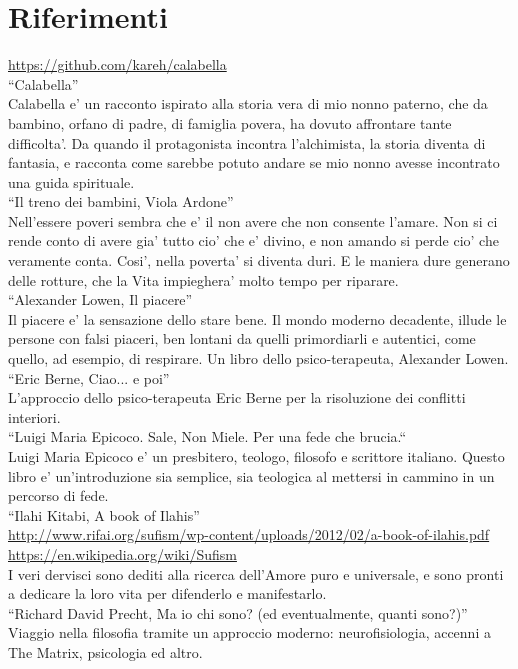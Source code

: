 \chapter{Riferimenti}
\label{chapRiferimenti}

  \url{https://github.com/kareh/calabella}\\
  ``Calabella''\\
  Calabella e' un racconto ispirato alla storia vera di mio nonno paterno, che da bambino, orfano di padre, di famiglia povera, ha dovuto affrontare tante difficolta'. Da quando il protagonista incontra l'alchimista, la storia diventa di fantasia, e racconta come sarebbe potuto andare se mio nonno avesse incontrato una guida spirituale.\\

  ``Il treno dei bambini, Viola Ardone''\\
  Nell'essere poveri sembra che e' il non avere che non consente l'amare. Non si ci rende conto di avere gia' tutto cio' che e' divino, e non amando si perde cio' che veramente conta. Cosi', nella poverta' si diventa duri. E le maniera dure generano delle rotture, che la Vita impieghera' molto tempo per riparare. \\

  ``Alexander Lowen, Il piacere''\\
  Il piacere e' la sensazione dello stare bene. Il mondo moderno decadente, illude le persone
  con falsi piaceri, ben lontani da quelli primordiarli e autentici, come quello, ad esempio,
  di respirare. Un libro dello psico-terapeuta, Alexander Lowen.\\
  
  ``Eric Berne, Ciao... e poi''\\
  L'approccio dello psico-terapeuta Eric Berne per la risoluzione dei conflitti interiori.\\
  
  ``Luigi Maria Epicoco. Sale, Non Miele. Per una fede che brucia.``\\
  Luigi Maria Epicoco e' un presbitero, teologo, filosofo e scrittore italiano. Questo libro e' un'introduzione sia semplice, sia teologica al mettersi in cammino in un percorso di fede.\\

  ``Ilahi Kitabi, A book of Ilahis''\\
  \url{http://www.rifai.org/sufism/wp-content/uploads/2012/02/a-book-of-ilahis.pdf}\\
  \url{https://en.wikipedia.org/wiki/Sufism}\\
  I veri dervisci sono dediti alla ricerca dell'Amore puro e universale, e sono pronti a
  dedicare la loro vita per difenderlo e manifestarlo.\\

  ``Richard David Precht, Ma io chi sono? (ed eventualmente, quanti sono?)''\\
  Viaggio nella filosofia tramite un approccio moderno: neurofisiologia, accenni a The Matrix, psicologia ed altro.\\
   
